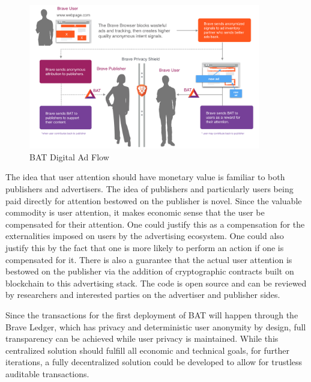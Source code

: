 \documentclass[11pt]{article}
\begin{document}
\begin{figure}
\begin{center}
\includegraphics[width=0.9\textwidth]{BAT_digital_ad_flow.png}
\caption{BAT Digital Ad Flow}
\end{center}
\end{figure}



The idea that user attention should have monetary value is familiar to
both publishers and advertisers. The idea of publishers and
particularly users being paid directly for attention bestowed on the
publisher is novel. Since the valuable commodity is user attention, it
makes economic sense that the user be compensated for their
attention. One could justify this as a compensation for the
externalities imposed on users by the advertising ecosystem. One could
also justify this by the fact that one is more likely to perform an
action if one is compensated for it. There is also a guarantee that
the actual user attention is bestowed on the publisher via the
addition of cryptographic contracts built on blockchain to this
advertising stack.  The code is open source and can be reviewed by
researchers and interested parties on the advertiser and publisher sides.

Since the transactions for the first deployment of BAT will happen
through the Brave Ledger, which has privacy and deterministic user
anonymity by design, full transparency can be achieved while user privacy is maintained. While this 
centralized solution should fulfill all economic and technical goals, for further iterations, a fully
decentralized solution could be developed to allow for trustless
auditable transactions.
\end{document}
